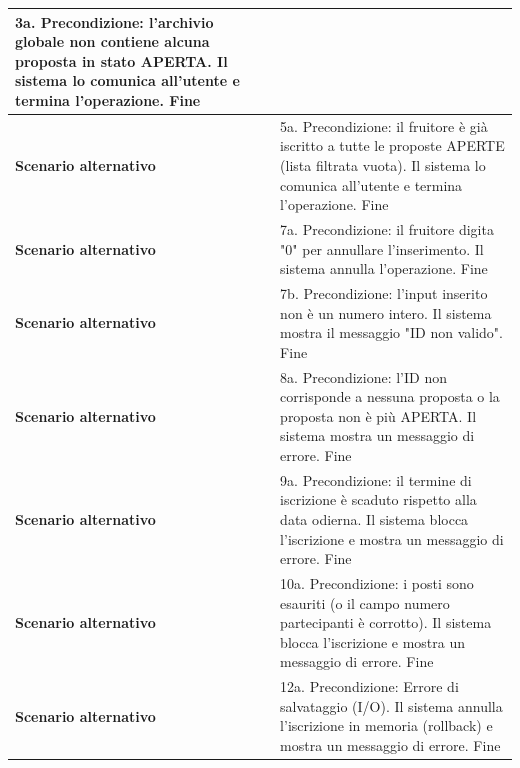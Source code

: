 \documentclass[12pt, a4paper, oneside]{report}
\begin{document}
\begin{tabularx}{\textwidth}{|l|X|}
    3a. Precondizione: l'archivio globale non contiene alcuna proposta in stato APERTA.\newline
    Il sistema lo comunica all'utente e termina l'operazione.\newline
    Fine \\ \hline
    \textbf{Scenario alternativo} & 
    5a. Precondizione: il fruitore è già iscritto a tutte le proposte APERTE (lista filtrata vuota).\newline
    Il sistema lo comunica all'utente e termina l'operazione.\newline
    Fine \\ \hline
    \textbf{Scenario alternativo} & 
    7a. Precondizione: il fruitore digita "0" per annullare l'inserimento.\newline
    Il sistema annulla l'operazione.\newline
    Fine \\ \hline
    \textbf{Scenario alternativo} & 
    7b. Precondizione: l'input inserito non è un numero intero.\newline
    Il sistema mostra il messaggio "ID non valido".\newline
    Fine \\ \hline
    \textbf{Scenario alternativo} & 
    8a. Precondizione: l'ID non corrisponde a nessuna proposta o la proposta non è più APERTA.\newline
    Il sistema mostra un messaggio di errore.\newline
    Fine \\ \hline
    \textbf{Scenario alternativo} & 
    9a. Precondizione: il termine di iscrizione è scaduto rispetto alla data odierna.\newline
    Il sistema blocca l'iscrizione e mostra un messaggio di errore.\newline
    Fine \\ \hline
    \textbf{Scenario alternativo} & 
    10a. Precondizione: i posti sono esauriti (o il campo numero partecipanti è corrotto).\newline
    Il sistema blocca l'iscrizione e mostra un messaggio di errore.\newline
    Fine \\ \hline
    \textbf{Scenario alternativo} & 
    12a. Precondizione: Errore di salvataggio (I/O).\newline
    Il sistema annulla l'iscrizione in memoria (rollback) e mostra un messaggio di errore.\newline
    Fine \\ \hline
\end{tabularx}
\end{document}
